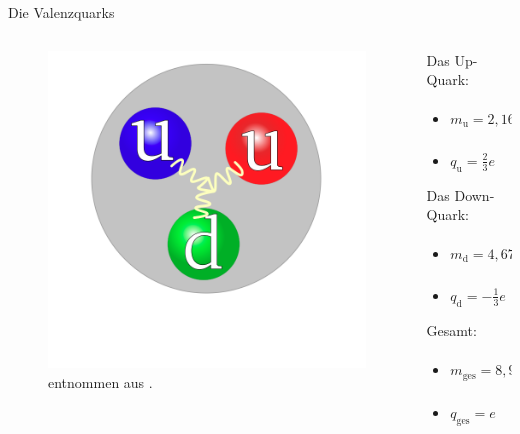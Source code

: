 \documentclass[aspectratio=1610, 9pt]{beamer}
\begin{document}
\begin{frame}{Die Valenzquarks}
  \begin{columns}
    \begin{column}{0.40\textwidth}
      \begin{figure}
        \includegraphics[width = \textwidth]{images/Proton.png}
        \caption{entnommen aus \cite{Wiki-Proton}.}
      \end{figure}
    \end{column}

    \begin{column}{0.45\textwidth}
      Das Up-Quark:
      \begin{itemize}
        \item{ $ m_\text{u} = 2,16 \substack{+0.49 \\ -0.26} \,\mathrm{MeV} $  }
        \item{ $ q_\text{u} = \frac{2}{3} e$ }
      \end{itemize}

      Das Down-Quark:
      \begin{itemize}
        \item{ $ m_\text{d} = 4,67 \substack{+0.48 \\ -0.17} \,\mathrm{MeV} $  }
        \item{ $q_\text{d} = - \frac{1}{3} e$ }
      \end{itemize}

      Gesamt:
      \begin{itemize}
        \item{ $ m_\text{ges} = 8,99 \substack{+1,09 \\ -0.55} \,\mathrm{MeV} $  }
        \item{ $ q_\text{ges} =  e$ }
      \end{itemize}

    \end{column}
  \end{columns}
\end{frame}
\end{document}
